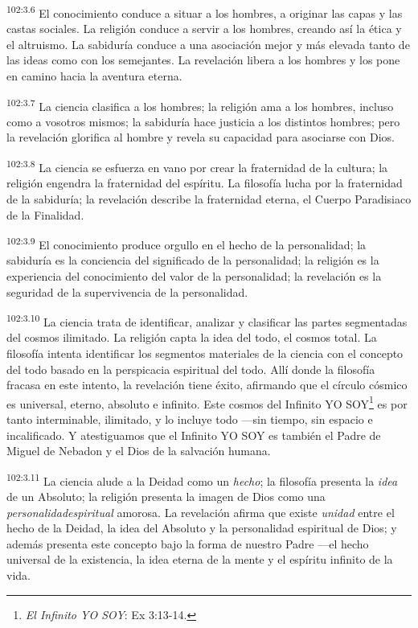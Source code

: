 \documentclass[twoside, 11pt]{book}
\begin{document}
\par
\textsuperscript{102:3.6} El conocimiento conduce a situar a los hombres, a originar las capas y las castas sociales. La religión conduce a servir a los hombres, creando así la ética y el altruismo. La sabiduría conduce a una asociación mejor y más elevada tanto de las ideas como con los semejantes. La revelación libera a los hombres y los pone en camino hacia la aventura eterna.

\par
\textsuperscript{102:3.7} La ciencia clasifica a los hombres; la religión ama a los hombres, incluso como a vosotros mismos; la sabiduría hace justicia a los distintos hombres; pero la revelación glorifica al hombre y revela su capacidad para asociarse con Dios.

\par
\textsuperscript{102:3.8} La ciencia se esfuerza en vano por crear la fraternidad de la cultura; la religión engendra la fraternidad del espíritu. La filosofía lucha por la fraternidad de la sabiduría; la revelación describe la fraternidad eterna, el Cuerpo Paradisiaco de la Finalidad.

\par
\textsuperscript{102:3.9} El conocimiento produce orgullo en el hecho de la personalidad; la sabiduría es la conciencia del significado de la personalidad; la religión es la experiencia del conocimiento del valor de la personalidad; la revelación es la seguridad de la supervivencia de la personalidad.

\par
\textsuperscript{102:3.10} La ciencia trata de identificar, analizar y clasificar las partes segmentadas del cosmos ilimitado. La religión capta la idea del todo, el cosmos total. La filosofía intenta identificar los segmentos materiales de la ciencia con el concepto del todo basado en la perspicacia espiritual del todo. Allí donde la filosofía fracasa en este intento, la revelación tiene éxito, afirmando que el círculo cósmico es universal, eterno, absoluto e infinito. Este cosmos del Infinito YO SOY\footnote{\textit{El Infinito YO SOY}: Ex 3:13-14.} es por tanto interminable, ilimitado, y lo incluye todo ---sin tiempo, sin espacio e incalificado. Y atestiguamos que el Infinito YO SOY es también el Padre de Miguel de Nebadon y el Dios de la salvación humana.

\par
\textsuperscript{102:3.11} La ciencia alude a la Deidad como un \textit{hecho}; la filosofía presenta la \textit{idea} de un Absoluto; la religión presenta la imagen de Dios como una \textit{personalidadespiritual} amorosa. La revelación afirma que existe \textit{unidad} entre el hecho de la Deidad, la idea del Absoluto y la personalidad espiritual de Dios; y además presenta este concepto bajo la forma de nuestro Padre ---el hecho universal de la existencia, la idea eterna de la mente y el espíritu infinito de la vida.
\end{document}
